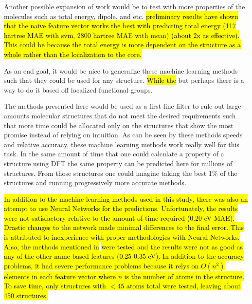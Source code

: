 \documentclass[10pt]{article}
\begin{document}
Another possible expansion of work would be to test with more properties of the molecules such as total energy, dipole, and etc. \hl{preliminary results have shown that the naive feature vector works the best with predicting total energy (117 hartree MAE with svm, 2800 hartree MAE with mean) (about 2x as effective). This could be because the total energy is more dependent on the structure as a whole rather than the localization to the core.}

As an end goal, it would be nice to generalize these machine learning methods such that they could be used for any structure. \hl{While the} but perhaps there is a way to do it based off localized functional groups.

The methods presented here would be used as a first line filter to rule out large amounts molecular structures that do not meet the desired requirements such that more time could be allocated only on the structures that show the most promise instead of relying on intuition. As can be seen by these methods speeds and relative accuracy, these machine learning methods work really well for this task. In the same amount of time that one could calculate a property of a structure using DFT the same property can be predicted here for millions of structures. From those structures one could imagine taking the best 1\% of the structures and running progressively more accurate methods.

\hl{In addition to the machine learning methods used in this study, there was also an attempt to use Neural Networks for the predictions. Unfortunately, the results were not satisfactory relative to the amount of time required (0.20 eV MAE). Drastic changes to the network made minimal differences to the final error. This is attributed to inexperience with proper methodologies with Neural Networks.}
\hl{Also, the methods mentioned in }\cite{hansen_assessment_2013} \hl{were tested and the results were not as good as any of the other name based features (0.25-0.35 eV). In addition to the accuracy problems, it had severe performance problems because it relys on $O(n^2)$ elements in each feature vector where $n$ is the number of atoms in the structure. To save time, only structures with $<45$ atoms total were tested, leaving about 450 structures.}

\nocite{ruddigkeit_enumeration_2012}
\nocite{darley_beyond_2008}
\nocite{frisch_gaussian_2009}
\nocite{montavon_machine_2013}
\nocite{handley_dynamically_2009}
\nocite{hansen_assessment_2013}
\nocite{schutt_how_2013}
\nocite{reymond_exploring_2012}
\nocite{whitfield_computational_2013}
\nocite{hansen_assessment_2013-1}
\nocite{ra_dft_2008}
\nocite{martell_assessment_1997}
\nocite{montavon_learning_2012}
\nocite{domingos_few_2012}
\nocite{martin_benchmark_1997}
\nocite{handley_potential_2010}
\nocite{rupp_fast_2012}
\end{document}

